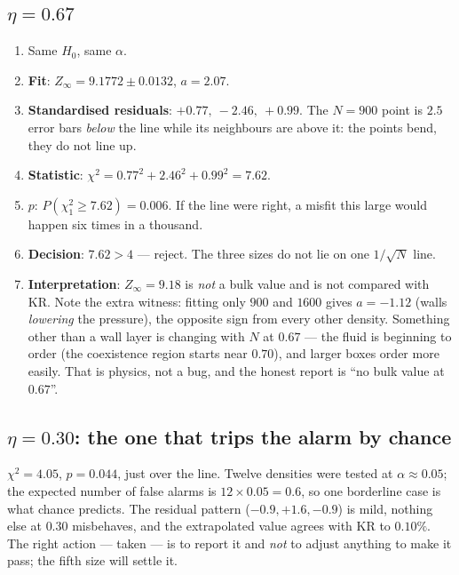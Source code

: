 \documentclass[11pt,a4paper]{article}
\begin{document}
\subsection{\texorpdfstring{$\eta = 0.67$}{eta = 0.67}}
\begin{enumerate}[nosep]
\item Same $H_0$, same $\alpha$.
\item \textbf{Fit}: $Z_\infty = 9.1772\pm0.0132$, $a = 2.07$.
\item \textbf{Standardised residuals}: $+0.77,\ -2.46,\ +0.99$. The $N = 900$ point is $2.5$ error bars \emph{below} the line while its neighbours are above it: the points bend, they do not line up.
\item \textbf{Statistic}: $\chi^2 = 0.77^2 + 2.46^2 + 0.99^2 = 7.62$.
\item \textbf{$p$}: $P(\chi^2_1\ge7.62) = 0.006$. If the line were right, a misfit this large would happen six times in a thousand.
\item \textbf{Decision}: $7.62 > 4$ --- reject. The three sizes do not lie on one $1/\sqrt N$ line.
\item \textbf{Interpretation}: $Z_\infty = 9.18$ is \emph{not} a bulk value and is not compared with KR. Note the extra witness: fitting only $900$ and $1600$ gives $a = -1.12$ (walls \emph{lowering} the pressure), the opposite sign from every other density. Something other than a wall layer is changing with $N$ at $0.67$ --- the fluid is beginning to order (the coexistence region starts near $0.70$), and larger boxes order more easily. That is physics, not a bug, and the honest report is ``no bulk value at $0.67$''.
\end{enumerate}

\subsection{\texorpdfstring{$\eta = 0.30$}{eta = 0.30}: the one that trips the alarm by chance}
$\chi^2 = 4.05$, $p = 0.044$, just over the line. Twelve densities were tested at $\alpha\approx0.05$; the expected number of false alarms is $12\times0.05 = 0.6$, so one borderline case is what chance predicts. The residual pattern ($-0.9, +1.6, -0.9$) is mild, nothing else at $0.30$ misbehaves, and the extrapolated value agrees with KR to $0.10\%$. The right action --- taken --- is to report it and \emph{not} to adjust anything to make it pass; the fifth size will settle it.
\end{document}
